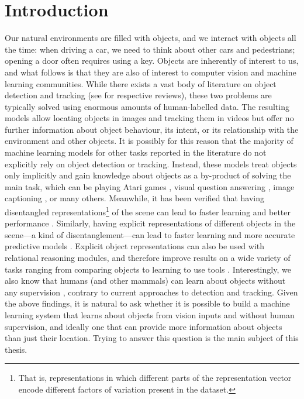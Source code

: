 \chapter{Introduction}
\label{ch:introduction}
%

Our natural environments are filled with objects, and we interact with objects all the time: when driving a car, we need to think about other cars and pedestrians; opening a door often requires using a key.
Objects are inherently of interest to us, and what follows is that they are also of interest to computer vision and machine learning communities.
While there exists a vast body of literature on object detection and tracking (see\eg \cite{Liu2018deepod,Ciaparrone2019deepmot} for respective reviews), these two problems are typically solved using enormous amounts of human-labelled data. 
The resulting models allow locating objects in images and tracking them in videos but offer no further information about object behaviour, its intent, or its relationship with the environment and other objects.
It is possibly for this reason that the majority of machine learning models for other tasks reported in the literature do not explicitly rely on object detection or tracking.
Instead, these models treat objects only implicitly and gain knowledge about objects as a by-product of solving the main task, which can be playing Atari games \citep{Mnih2013dqn}, visual question answering \citep{Malinowski2015vqn}, image captioning \citep{Xu2015show}, or many others.
Meanwhile, it has been verified that having disentangled representations\footnote{That is, representations in which different parts of the representation vector encode different factors of variation present in the dataset.} of the scene can lead to faster learning and better performance \citep{Steenkiste2019disentangled}.
Similarly, having explicit representations of different objects in the scene---a kind of disentanglement---can lead to faster learning and more accurate predictive models \citep{Veerapaneni2019op3}. 
Explicit object representations can also be used with relational reasoning modules, and therefore improve results on a wide variety of tasks ranging from comparing objects \citep{Santoro2017} to learning to use tools \citep{Baker2019tooluse}.
Interestingly, we also know that humans (and other mammals) can learn about objects without any supervision \citep{Lambert2017cows}, contrary to current approaches to detection and tracking.
Given the above findings, it is natural to ask whether it is possible to build a machine learning system that learns about objects from vision inputs and without human supervision, and ideally one that can provide more information about objects than just their location.
Trying to answer this question is the main subject of this thesis.

